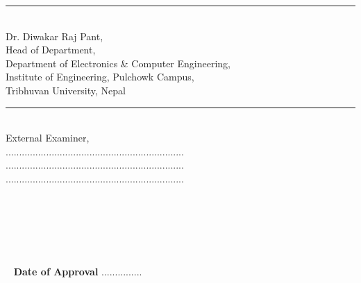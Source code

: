 \begin{minipage}[t]{0.55\textwidth}
  \rule{2in}{1pt}\\
  Dr. Diwakar Raj Pant,\\
  Head of Department,\\
  \small
  Department of Electronics \& Computer Engineering,\\
  Institute of Engineering, Pulchowk Campus,\\
  Tribhuvan University, Nepal
\end{minipage}
\hspace{0.5cm}
\begin{minipage}[t]{0.40\textwidth}
  \rule{2in}{1pt}\\
  External Examiner,\\
  ..................................................................\\
  ..................................................................\\
  ..................................................................\\
\end{minipage}
~

~

~
~

~
{\bf Date of Approval} ...............\\
